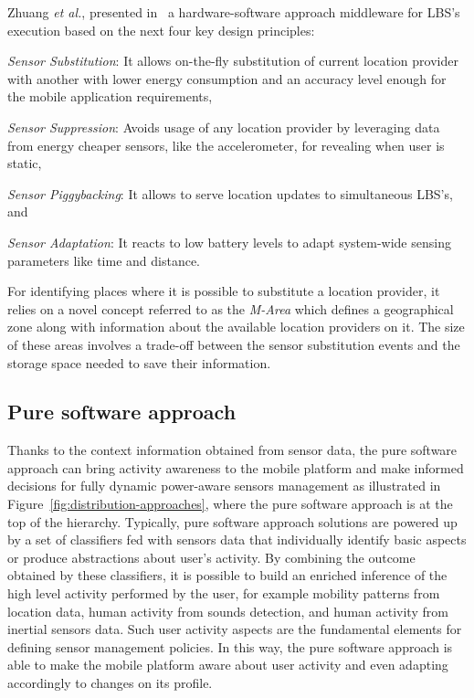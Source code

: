 \documentclass[12pt]{article}
\numberwithin{equation}{section}
\numberwithin{table}{section}
\numberwithin{figure}{section}
\begin{document}
Zhuang \emph{et al.}, presented in~\cite{Zhuang2010} a hardware-software approach middleware for LBS's execution based on the next four key design principles: 
\begin{listahorizontal}
  \item \emph{Sensor Substitution}: It allows on-the-fly substitution of current location provider with another with lower energy consumption and an accuracy level enough for the mobile application requirements,
  \item \emph{Sensor Suppression}: Avoids usage of any location provider by leveraging data from energy cheaper sensors, like the accelerometer, for revealing when user is static,
  \item \emph{Sensor Piggybacking}: It allows to serve location updates to simultaneous LBS's, and
  \item \emph{Sensor Adaptation}: It reacts to low battery levels to adapt system-wide sensing parameters like time and distance.
\end{listahorizontal}
For identifying places where it is possible to substitute a location provider, it relies on a novel concept referred to as the \emph{M-Area} which defines a geographical zone along with information about the available location providers on it.
The size of these areas involves a trade-off between the sensor substitution events and the storage space needed to save their information.

\subsection{Pure software approach}
Thanks to the context information obtained from sensor data, the pure software approach can bring activity awareness to the mobile platform and make informed decisions for fully dynamic power-aware sensors management as illustrated in Figure~\ref{fig:distribution-approaches}, where the pure software approach is at the top of the hierarchy.
Typically, pure software approach solutions are powered up by a set of classifiers fed with sensors data that individually identify basic aspects or produce abstractions about user's activity.
By combining the outcome obtained by these classifiers, it is possible to build an enriched inference of the high level activity performed by the user, for example mobility patterns from location data, human activity from sounds detection, and human activity from inertial sensors data.
Such user activity aspects are the fundamental elements for defining sensor management policies.
In this way, the pure software approach is able to make the mobile platform aware about user activity and even adapting accordingly to changes on its profile.
\end{document}
